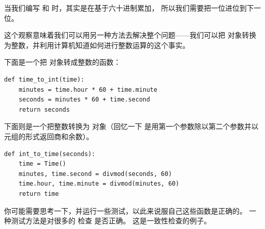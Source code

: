 {%

当我们编写  和  时，其实是在基于六十进制累加，
所以我们需要把一位进位到下一位。


这个观察意味着我们可以用另一种方法去解决整个问题——我们可以把
 对象转换为整数，并利用计算机知道如何进行整数运算的这个事实。


下面是一个把  对象转成整数的函数：

\begin{lstlisting}
def time_to_int(time):
    minutes = time.hour * 60 + time.minute
    seconds = minutes * 60 + time.second
    return seconds
\end{lstlisting}

%

下面则是一个把整数转换为  对象（回忆一下  是用第一个参数除以第二个参数并以元组的形式返回商和余数）。

\begin{lstlisting}
def int_to_time(seconds):
    time = Time()
    minutes, time.second = divmod(seconds, 60)
    time.hour, time.minute = divmod(minutes, 60)
    return time
\end{lstlisting}

%

你可能需要思考一下，并运行一些测试，以此来说服自己这些函数是正确的。
一种测试方法是对很多的  检查 
是否正确。  这是一致性检查的例子。


}

